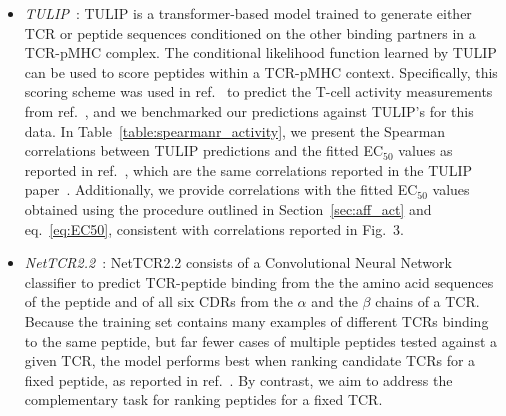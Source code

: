 \begin{itemize}
TCRdock takes as input sequences of a TCR, MHC, and peptide, and identifies TCR-pMHC structures in
its database with similar amino acid sequences to the query to serve as templates to model the
structure of the input TCR-pMHC complex. To examine how template-query sequence similarity
influences TCRdock's predictive accuracy, we ran the algorithm under two conditions: the default
mode, which uses any closest-matching templates available, and the {\em benchmark} mode, which
restricts the maximum sequence similarity of templates with the input TCR-pMHC.

We use TCRdock to characterize peptide energies, and to filter the sequences designed by HERMES.
However, TCRdock does not provide a natural way to sample peptides for design, and because of its
high computational cost, we did not include TCRdock PAE calculations in our design pipeline (e.g.,
for MCMC sampling).\\

\item {\em TULIP}~\cite{Meynard-Piganeau2024-po}: TULIP is a transformer-based model trained to
generate either TCR or peptide sequences conditioned on the other binding partners in a TCR-pMHC
complex. The conditional likelihood function learned by TULIP can be used to score peptides within a
TCR-pMHC context. Specifically, this scoring scheme was used in ref.~\cite{Meynard-Piganeau2024-po}
to predict the T-cell activity measurements from ref.~\cite{Luksza2022-gx}, and we benchmarked our
predictions against TULIP's for this data. In Table~\ref{table:spearmanr_activity}, we present the
Spearman correlations between TULIP predictions and the fitted EC$_{50}$ values as reported in
ref.~\cite{Luksza2022-gx}, which are the same correlations reported in the TULIP
paper~\cite{Meynard-Piganeau2024-po}. Additionally, we provide correlations with the fitted
EC$_{50}$ values obtained using the procedure outlined in Section~\ref{sec:aff_act} and
eq.~\ref{eq:EC50}, consistent with correlations reported in Fig.~3.\\


\item {\em NetTCR2.2}~\cite{Jensen2024-xs}: NetTCR2.2 consists of a Convolutional Neural Network
classifier to predict TCR-peptide binding from the the amino acid sequences of the peptide and of
all six CDRs from the $\alpha$ and the $\beta$ chains of a TCR. Because the training set contains
many examples of different TCRs binding to the same peptide, but far fewer cases of multiple
peptides tested against a given TCR, the model performs best when ranking candidate TCRs for a fixed
peptide, as reported in ref.~\cite{Jensen2024-xs}. By contrast, we aim to address the complementary
task for ranking peptides for a fixed TCR.


\end{itemize}
